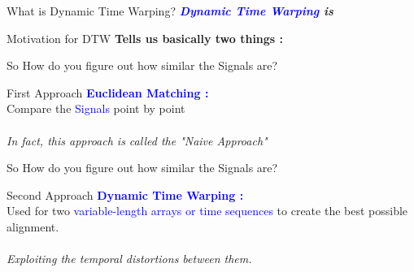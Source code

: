 \documentclass[hyperref={pdfpagelabels=false}]{beamer}
\begin{document}
\begin{frame}{What is Dynamic Time Warping?}
    \textit{\textbf{\Large{\textcolor{blue}{Dynamic Time Warping} is }} }
    \begin{itemize}
    \end{itemize}

\end{frame}

\begin{frame}{Motivation for DTW}
    \textbf{\Large{Tells us basically two things :}} 
    \begin{itemize}
    \end{itemize}

\end{frame}



\begin{frame}{So How do you figure out how similar the Signals are?}
\begin{block}{First Approach}
    \textcolor{blue}{\textbf{Euclidean Matching :}}\\
    Compare the \textcolor{blue}{Signals} point by point\\ \\
    \textit{In fact, this approach is called the "Naive Approach"}
\end{block}    
\end{frame}

\begin{frame}{So How do you figure out how similar the Signals are?}
\begin{block}{Second Approach}
    \textcolor{blue}{\textbf{Dynamic Time Warping :}}\\
    Used for two \textcolor{blue}{variable-length arrays or time sequences} to create the best possible alignment. \\ \\ 
    \textit{Exploiting the temporal distortions between them.}
\end{block}    
\end{frame}
\end{document}
